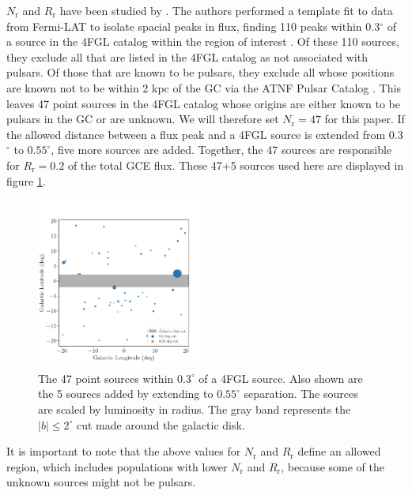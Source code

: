 \documentclass[a4paper,11pt]{article}
\newcommand{\comment}[1]{\emph{\color{red}{#1}}}
\begin{document}
$N_\text{r}$ and $R_\text{r}$ have been studied by \comment{Some technical name for the Fermilab team.} \cite{Zhong:2019ycb}. The authors performed a template fit to data from Fermi-LAT to isolate spacial peaks in flux, finding 110 \comment{(I got 110; their paper says 107)} peaks within 0.3$^\circ$ of a source in the 4FGL catalog within the region of interest \cite{Abdollahi_2020}. Of these 110 sources, they exclude all that are listed in the 4FGL catalog as not associated with pulsars. Of those that are known to be pulsars, they exclude all whose positions are known not to be within 2 kpc of the GC via the ATNF Pulsar Catalog \cite{Hobbs04}. This leaves 47 point sources in the 4FGL catalog whose origins are either known to be pulsars in the GC or are unknown. We will therefore set $N_\text{r} = 47$ for this paper. If the allowed distance between a flux peak and a 4FGL source is extended from 0.3$^\circ$ to $0.55^\circ$, five more sources are added. Together, the 47 sources are responsible for $R_\text{r}=0.2$ of the total GCE flux. \comment{Shouldn't I actually redo this addition given the fact that I'm now not using the same GCE flux as Fermilab?} These 47+5 sources used here are displayed in figure \ref{fig:47-sources}.

\begin{figure}
    \centering
    \includegraphics[width=0.5\textwidth]{figs/point-source-positions.pdf}
    \caption{The 47 point sources within $0.3^\circ$ of a 4FGL source. Also shown are the 5 sourecs added by extending to $0.55^\circ$ separation. The sources are scaled by luminosity in radius. The gray band represents the $|b| \leq 2^\circ$ cut made around the galactic disk.}
    \label{fig:47-sources}
\end{figure}

It is important to note that the above values for $N_\text{r}$ and $R_\text{r}$ define an allowed region, which includes populations with lower $N_\text{r}$ and $R_\text{r}$, because some of the unknown sources might not be pulsars.
\end{document}
